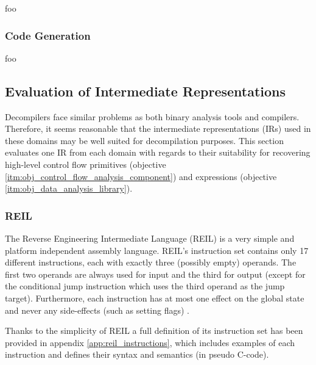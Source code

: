 foo


\subsubsection{Code Generation}

foo


\subsection{Evaluation of Intermediate Representations}

Decompilers face similar problems as both binary analysis tools and compilers. Therefore, it seems reasonable that the intermediate representations (IRs) used in these domains may be well suited for decompilation purposes. This section evaluates one IR from each domain with regards to their suitability for recovering high-level control flow primitives (objective \ref{itm:obj_control_flow_analysis_component}) and expressions (objective \ref{itm:obj_data_analysis_library}).


\subsubsection{REIL}

The Reverse Engineering Intermediate Language (REIL) is a very simple and platform independent assembly language. REIL's instruction set contains only 17 different instructions, each with exactly three (possibly empty) operands. The first two operands are always used for input and the third for output (except for the conditional jump instruction which uses the third operand as the jump target). Furthermore, each instruction has at most one effect on the global state and never any side-effects (such as setting flags) \cite{reil,reil_spec}.


Thanks to the simplicity of REIL a full definition of its instruction set has been provided in appendix \ref{app:reil_instructions}, which includes examples of each instruction and defines their syntax and semantics (in pseudo C-code).

